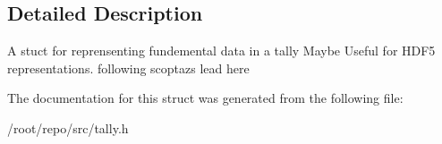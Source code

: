 \subsection{Detailed Description}
A stuct for reprensenting fundemental data in a tally Maybe Useful for H\+D\+F5 representations. following scoptaz\textquotesingle{}s lead here 

The documentation for this struct was generated from the following file\+:\begin{DoxyCompactItemize}
\item 
/root/repo/src/tally.\+h\end{DoxyCompactItemize}
